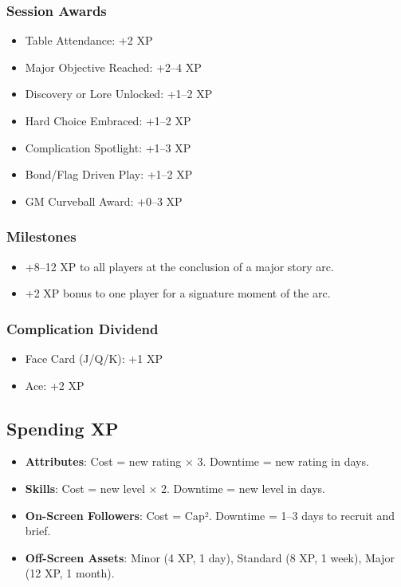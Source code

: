 \documentclass[11pt]{article}
\begin{document}
\subsubsection{Session Awards}
\begin{itemize}
    \item Table Attendance: +2 XP
    \item Major Objective Reached: +2–4 XP
    \item Discovery or Lore Unlocked: +1–2 XP
    \item Hard Choice Embraced: +1–2 XP
    \item Complication Spotlight: +1–3 XP
    \item Bond/Flag Driven Play: +1–2 XP
    \item GM Curveball Award: +0–3 XP
\end{itemize}

\subsubsection{Milestones}
\begin{itemize}
    \item +8–12 XP to all players at the conclusion of a major story arc.
    \item +2 XP bonus to one player for a signature moment of the arc.
\end{itemize}

\subsubsection{Complication Dividend}
\begin{itemize}
    \item Face Card (J/Q/K): +1 XP
    \item Ace: +2 XP
\end{itemize}

\subsection{Spending XP}
\begin{itemize}
    \item \textbf{Attributes}: Cost = new rating × 3. Downtime = new rating in days.
    \item \textbf{Skills}: Cost = new level × 2. Downtime = new level in days.
    \item \textbf{On-Screen Followers}: Cost = Cap². Downtime = 1–3 days to recruit and brief.
    \item \textbf{Off-Screen Assets}: Minor (4 XP, 1 day), Standard (8 XP, 1 week), Major (12 XP, 1 month).
\end{itemize}
\end{document}

